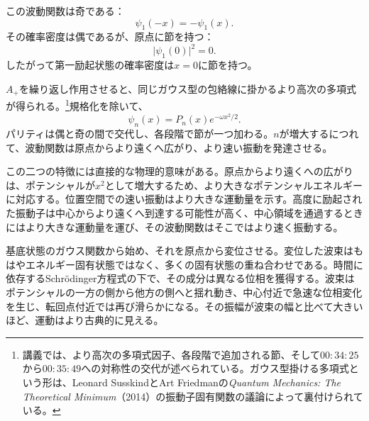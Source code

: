 この波動関数は奇である：
\begin{equation}
\psi_{1}(-x)=-\psi_{1}(x).
\end{equation}
その確率密度は偶であるが、原点に節を持つ：
\begin{equation}
\lvert\psi_{1}(0)\rvert^{2}=0.
\end{equation}
したがって第一励起状態の確率密度は\(x=0\)に節を持つ。

\(A_{+}\)を繰り返し作用させると、同じガウス型の包絡線に掛かるより高次の多項式が得られる。\footnote{講義では、より高次の多項式因子、各段階で追加される節、そして\(00{:}34{:}25\)から\(00{:}35{:}49\)への対称性の交代が述べられている。ガウス型掛ける多項式という形は、Leonard SusskindとArt Friedmanの\emph{Quantum Mechanics: The Theoretical Minimum}（2014）の振動子固有関数の議論によって裏付けられている。}規格化を除いて、
\begin{equation}
\psi_{n}(x)=P_{n}(x)e^{-\omega x^{2}/2}.
\end{equation}
パリティは偶と奇の間で交代し、各段階で節が一つ加わる。\(n\)が増大するにつれて、波動関数は原点からより遠くへ広がり、より速い振動を発達させる。

この二つの特徴には直接的な物理的意味がある。原点からより遠くへの広がりは、ポテンシャルが\(x^{2}\)として増大するため、より大きなポテンシャルエネルギーに対応する。位置空間での速い振動はより大きな運動量を示す。高度に励起された振動子は中心からより遠くへ到達する可能性が高く、中心領域を通過するときにはより大きな運動量を運び、その波動関数はそこではより速く振動する。

\begin{classroomqa}
\end{classroomqa}

基底状態のガウス関数から始め、それを原点から変位させる。変位した波束はもはやエネルギー固有状態ではなく、多くの固有状態の重ね合わせである。時間に依存するSchr\"odinger方程式の下で、その成分は異なる位相を獲得する。波束はポテンシャルの一方の側から他方の側へと揺れ動き、中心付近で急速な位相変化を生じ、転回点付近では再び滑らかになる。その振幅が波束の幅と比べて大きいほど、運動はより古典的に見える。

\begin{classroomqa}
\end{classroomqa}

